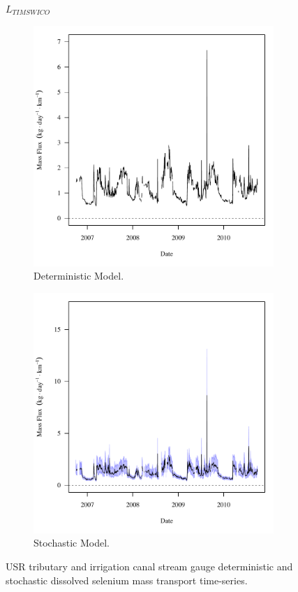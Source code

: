 \subfiguremid
\begin{landscape}
	\begin{figure}
		$ \displaystyle L_{TIMSWICO} $
		\begin{subfigure}{0.7\textwidth}
			\centering
			\includegraphics[width=\tableCustomSize]{"Figures/Results_USR/Deterministic/f TIM"}
			\caption{Deterministic Model.}
		\end{subfigure}%
		\begin{subfigure}{0.7\textwidth}
			\centering
			\includegraphics[width=\tableCustomSize]{"Figures/Results_USR/Stochastic/f TIM"}
			\caption{Stochastic Model.}
		\end{subfigure}
		\caption{USR tributary and irrigation canal stream gauge deterministic and stochastic dissolved selenium mass transport time-series.}
	\end{figure}
\end{landscape}
